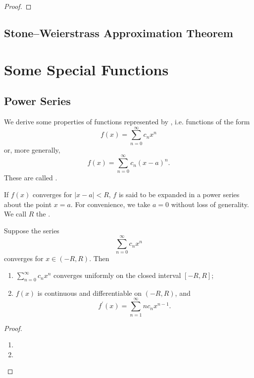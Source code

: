 \begin{proof}

\end{proof}

\section{Stone--Weierstrass Approximation Theorem}


\chapter{Some Special Functions}
\section{Power Series}
We derive some properties of functions represented by , i.e. functions of the form
\[ f(x)=\sum_{n=0}^\infty c_nx^n \]
or, more generally,
\[ f(x)=\sum_{n=0}^\infty c_n(x-a)^n. \]
These are called .

If $f(x)$ converges for $|x-a|<R$, $f$ is said to be expanded in a power series about the point $x=a$. For convenience, we take $a=0$ without loss of generality. We call $R$ the .

\begin{theorem}
Suppose the series 
\[ \sum_{n=0}^\infty c_nx^n \]
converges for $x\in(-R,R)$. Then
\begin{enumerate}[label=(\arabic*)]
\item $\sum_{n=0}^\infty c_nx^n$ converges uniformly on the closed interval $[-R,R]$;
\item $f(x)$ is continuous and differentiable on $(-R,R)$, and 
\[ f^\prime(x)=\sum_{n=1}^\infty nc_nx^{n-1}. \]
\end{enumerate}
\end{theorem}

\begin{proof} \
\begin{enumerate}[label=(\roman*)]
\item 
\item 
\end{enumerate}
\end{proof}